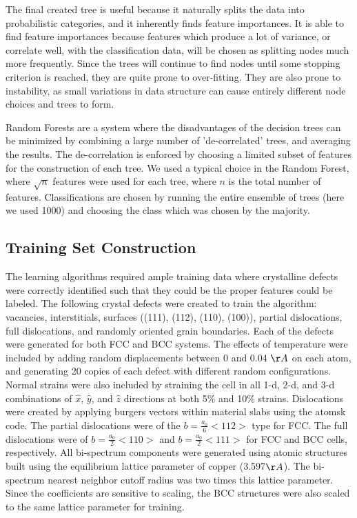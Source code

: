 \documentclass[12pt]{iopart}
\begin{document}
The final created tree is useful because it naturally splits the data into probabilistic categories, and it inherently finds feature importances. It is able to find feature importances because features which produce a lot of variance, or correlate well, with the classification data, will be chosen as splitting nodes much more frequently. Since the trees will continue to find nodes until some stopping criterion is reached, they are quite prone to over-fitting. They are also prone to instability, as small variations in data structure can cause entirely different node choices and trees to form.

Random Forests are a system where the disadvantages of the decision trees can be minimized by combining a large number of 'de-correlated' trees, and averaging the results. The de-correlation is enforced by choosing a limited subset of features for the construction of each tree. We used a typical choice in the Random Forest, where $\sqrt{n}$ features were used for each tree, where $n$ is the total number of features. Classifications are chosen by running the entire ensemble of trees (here we used 1000) and choosing the class which was chosen by the majority.

\subsection{Training Set Construction}

The learning algorithms required ample training data where crystalline defects were correctly identified such that they could be the proper features could be labeled. The following crystal defects were created to train the algorithm: vacancies, interstitials, surfaces ((111), (112), (110), (100)), partial dislocations, full dislocations, and randomly oriented grain boundaries. Each of the defects were generated for both FCC and BCC systems. The effects of temperature were included by adding random displacements between 0 and 0.04 $\AA$ on each atom, and generating 20 copies of each defect with different random configurations. Normal strains were also included by straining the cell in all 1-d, 2-d, and 3-d combinations of $\hat{x}$, $\hat{y}$, and $\hat{z}$ directions at both 5\% and 10\% strains. Dislocations were created by applying burgers vectors within material slabs using the atomsk \cite{Hirel2015} code. The partial dislocations were of the $b=\frac{a_0}{6}<112>$ type for FCC. The full dislocations were of $b=\frac{a_0}{2}<110>$ and $b=\frac{a_0}{2}<111>$ for FCC and BCC cells, respectively. All bi-spectrum components were generated using atomic structures built using the equilibrium lattice parameter of copper (3.597$\AA$). The bi-spectrum nearest neighbor cutoff radius was two times this lattice parameter. Since the coefficients are sensitive to scaling, the BCC structures were also scaled to the same lattice parameter for training. 
\end{document}
